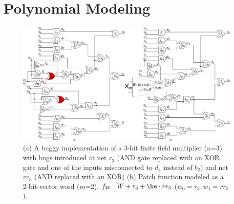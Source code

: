 \section{Polynomial Modeling}\label{sec:pmodel} 

\begin{figure}[hbt]
    \begin{center}
    \includegraphics[scale = 0.31]{mas_3_ddc_mfr.pdf}
    \end{center}
    \caption{{\footnotesize  
    (a) A buggy implementation of a 3-bit finite field multiplier ($n$=3)
    with bugs introduced at net $r_3$ (AND gate replaced with an XOR
    gate and one of the inputs misconnected to $d_4$ instead of $b_2$)
    and net $rr_3$ (AND replaced with an XOR) (b) Patch function
    modeled as a 2-bit-vector word ($m$=2), $f_W: W+r_3+\be \cdot rr_3$
    ($w_0=r_3, w_1=rr_3$).} }
    \label{fig:mas_bug_W}\vspace{-0.25in}
\end{figure}




